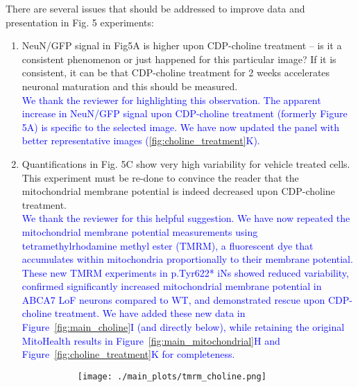 There are several issues that should be addressed to improve data and presentation in Fig. 5 experiments:
\begin{enumerate}
	\item NeuN/GFP signal in Fig5A is higher upon CDP-choline treatment – is it a consistent phenomenon or just happened for this particular image? If it is consistent, it can be that CDP-choline treatment for 2 weeks accelerates neuronal maturation and this should be measured.\\
	\textcolor{blue}{We thank the reviewer for highlighting this observation. The apparent increase in NeuN/GFP signal upon CDP-choline treatment (formerly Figure 5A) is specific to the selected image. We have now updated the panel with better representative images (\ref{fig:choline_treatment}K).}

	\item Quantifications in Fig. 5C show very high variability for vehicle treated cells. This experiment must be re-done to convince the reader that the mitochondrial membrane potential is indeed decreased upon CDP-choline treatment.\\
	\textcolor{blue}{We thank the reviewer for this helpful suggestion. We have now repeated the mitochondrial membrane potential measurements using tetramethylrhodamine methyl ester (TMRM), a fluorescent dye that accumulates within mitochondria proportionally to their membrane potential. These new TMRM experiments in p.Tyr622* iNs showed reduced variability, confirmed significantly increased mitochondrial membrane potential in ABCA7 LoF neurons compared to WT, and demonstrated rescue upon CDP-choline treatment. We have added these new data in Figure~\ref{fig:main_choline}I (and directly below), while retaining the original MitoHealth results in Figure~\ref{fig:main_mitochondrial}H and Figure~\ref{fig:choline_treatment}K for completeness.}

	\begin{figure}[H]
		\centering
		\begin{subfigure}[t]{.6\textwidth}
			\vspace{-0.15cm}
			\texttt{[image: ./main\_plots/tmrm\_choline.png]}        
		\end{subfigure} 
	\end{figure}


\end{enumerate}
